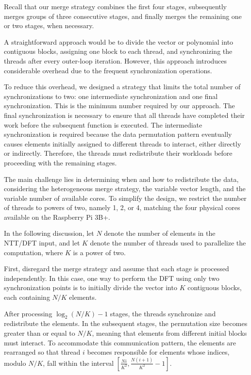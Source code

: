 Recall that our merge strategy combines the first four stages, subsequently merges groups of three consecutive stages, and finally merges the remaining one or two stages, when necessary.

A straightforward approach would be to divide the vector or polynomial into contiguous blocks, assigning one block to each thread, and synchronizing the threads after every outer-loop iteration. However, this approach introduces considerable overhead due to the frequent synchronization operations.

To reduce this overhead, we designed a strategy that limits the total number of synchronizations to two: one intermediate synchronization and one final synchronization. This is the minimum number required by our approach. The final synchronization is necessary to ensure that all threads have completed their work before the subsequent function is executed. The intermediate synchronization is required because the data permutation pattern eventually causes elements initially assigned to different threads to interact, either directly or indirectly. Therefore, the threads must redistribute their workloads before proceeding with the remaining stages.

The main challenge lies in determining when and how to redistribute the data, considering the heterogeneous merge strategy, the variable vector length, and the variable number of available cores. To simplify the design, we restrict the number of threads to powers of two, namely 1, 2, or 4, matching the four physical cores available on the Raspberry Pi 3B+.

In the following discussion, let $N$ denote the number of elements in the NTT/DFT input, and let $K$ denote the number of threads used to parallelize the computation, where $K$ is a power of two.

First, disregard the merge strategy and assume that each stage is processed independently. In this case, one way to perform the DFT using only two synchronization points is to initially divide the vector into $K$ contiguous blocks, each containing $N/K$ elements.

After processing $\log_2(N/K)-1$ stages, the threads synchronize and redistribute the elements. In the subsequent stages, the permutation size becomes greater than or equal to $N/K$, meaning that elements from different initial blocks must interact. To accommodate this communication pattern, the elements are rearranged so that thread $i$ becomes responsible for elements whose indices, modulo $N/K$, fall within the interval
$
\left[
\frac{Ni}{K^2},
\frac{N(i+1)}{K^2}-1
\right].
$

